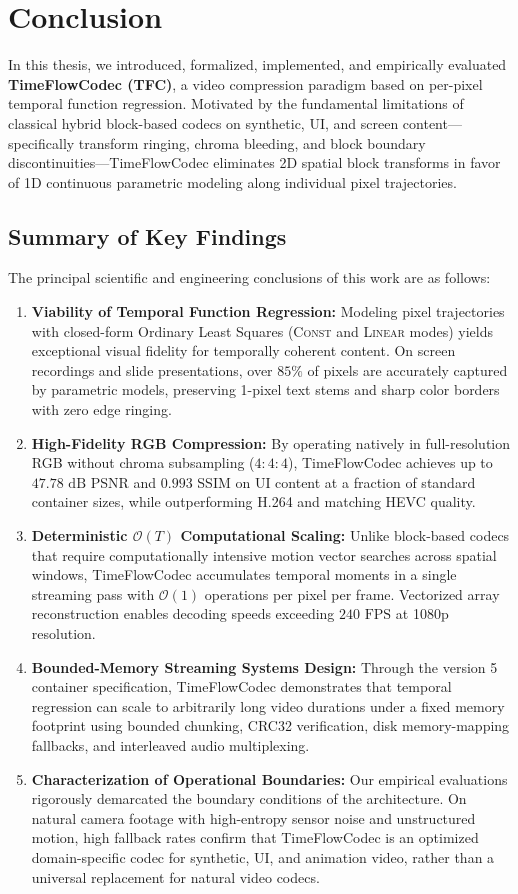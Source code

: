 \chapter{Conclusion}
\label{chap:conclusion}

In this thesis, we introduced, formalized, implemented, and empirically evaluated \textbf{TimeFlowCodec (TFC)}, a video compression paradigm based on per-pixel temporal function regression. Motivated by the fundamental limitations of classical hybrid block-based codecs on synthetic, UI, and screen content---specifically transform ringing, chroma bleeding, and block boundary discontinuities---TimeFlowCodec eliminates 2D spatial block transforms in favor of 1D continuous parametric modeling along individual pixel trajectories.

\section{Summary of Key Findings}
The principal scientific and engineering conclusions of this work are as follows:
\begin{enumerate}
    \item \textbf{Viability of Temporal Function Regression:} Modeling pixel trajectories with closed-form Ordinary Least Squares (\textsc{Const} and \textsc{Linear} modes) yields exceptional visual fidelity for temporally coherent content. On screen recordings and slide presentations, over $85\%$ of pixels are accurately captured by parametric models, preserving 1-pixel text stems and sharp color borders with zero edge ringing.
    \item \textbf{High-Fidelity RGB Compression:} By operating natively in full-resolution RGB without chroma subsampling ($4:4:4$), TimeFlowCodec achieves up to $47.78\text{ dB}$ PSNR and $0.993$ SSIM on UI content at a fraction of standard container sizes, while outperforming H.264 and matching HEVC quality.
    \item \textbf{Deterministic $\mathcal{O}(T)$ Computational Scaling:} Unlike block-based codecs that require computationally intensive motion vector searches across spatial windows, TimeFlowCodec accumulates temporal moments in a single streaming pass with $\mathcal{O}(1)$ operations per pixel per frame. Vectorized array reconstruction enables decoding speeds exceeding $240\text{ FPS}$ at 1080p resolution.
    \item \textbf{Bounded-Memory Streaming Systems Design:} Through the version 5 container specification, TimeFlowCodec demonstrates that temporal regression can scale to arbitrarily long video durations under a fixed memory footprint using bounded chunking, CRC32 verification, disk memory-mapping fallbacks, and interleaved audio multiplexing.
    \item \textbf{Characterization of Operational Boundaries:} Our empirical evaluations rigorously demarcated the boundary conditions of the architecture. On natural camera footage with high-entropy sensor noise and unstructured motion, high fallback rates confirm that TimeFlowCodec is an optimized domain-specific codec for synthetic, UI, and animation video, rather than a universal replacement for natural video codecs.
\end{enumerate}

